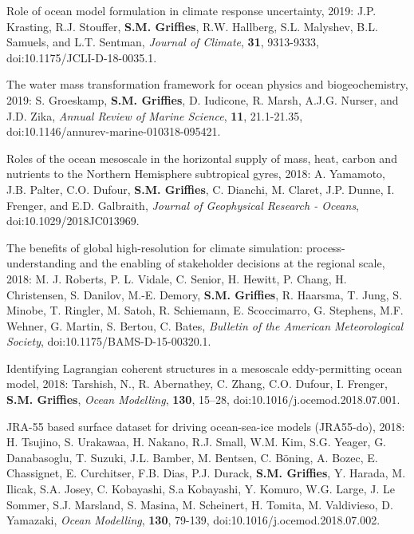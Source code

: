 \begin{etaremune}
\item Role of ocean model formulation in climate response uncertainty, 2019: J.P. Krasting, R.J. Stouffer, {\bf S.M. Grif\/f\/ies}, R.W. Hallberg, S.L. Malyshev, B.L. Samuels, and L.T. Sentman, {\it Journal of Climate}, {\bf 31}, 9313-9333, doi:10.1175/JCLI-D-18-0035.1.

\item The water mass transformation framework for ocean physics and biogeochemistry, 2019: S. Groeskamp, {\bf S.M. Grif\/f\/ies}, D. Iudicone,  R. Marsh, A.J.G. Nurser, and J.D. Zika, {\it Annual Review of Marine Science}, {\bf 11}, 21.1-21.35,
doi:10.1146/annurev-marine-010318-095421.


\item Roles of the ocean mesoscale in the horizontal supply of mass, heat, carbon and nutrients to the Northern Hemisphere subtropical gyres, 2018: A. Yamamoto, J.B. Palter, C.O. Dufour, {\bf S.M. Grif\/f\/ies}, C. Dianchi, M. Claret, J.P. Dunne, I. Frenger, and E.D. Galbraith, {\it Journal of Geophysical Research - Oceans},  doi:10.1029/2018JC013969.






\item The benefits of global high-resolution for climate simulation: process-understanding and the enabling of stakeholder decisions at the regional scale, 2018: M. J. Roberts, P. L. Vidale, C. Senior, H. Hewitt, P. Chang, H. Christensen, S. Danilov, M.-E. Demory, {\bf S.M. Grif\/f\/ies}, R. Haarsma, T. Jung, S. Minobe, T. Ringler, M. Satoh, R. Schiemann, E. Scoccimarro, G. Stephens, M.F. Wehner, G. Martin, S. Bertou, C. Bates, {\it Bulletin of the American Meteorological Society}, doi:10.1175/BAMS-D-15-00320.1. 

\item Identifying Lagrangian coherent structures in a mesoscale eddy-permitting ocean model, 2018: Tarshish, N., R. Abernathey, C. Zhang, C.O. Dufour, I. Frenger, {\bf S.M. Grif\/f\/ies}, \textit{Ocean Modelling}, {\bf 130}, 15--28, doi:10.1016/j.ocemod.2018.07.001.

\item JRA-55 based surface dataset for driving ocean-sea-ice models (JRA55-do), 2018: H. Tsujino, S. Urakawaa, H. Nakano, R.J. Small, W.M. Kim, S.G. Yeager, G. Danabasoglu, T. Suzuki, J.L. Bamber, M. Bentsen, C. {B\"{o}ning}, A. Bozec, E. Chassignet, E. Curchitser, F.B. Dias, P.J. Durack, {\bf S.M. Grif\/f\/ies}, Y. Harada, M. Ilicak, S.A. Josey, C. Kobayashi, S.a Kobayashi, Y. Komuro, W.G. Large, J. {Le Sommer}, S.J. Marsland, S. Masina, M. Scheinert, H. Tomita, M. Valdivieso, D. Yamazaki, {\it Ocean Modelling},  {\bf 130}, 79-139, doi:10.1016/j.ocemod.2018.07.002.


\end{etaremune}
